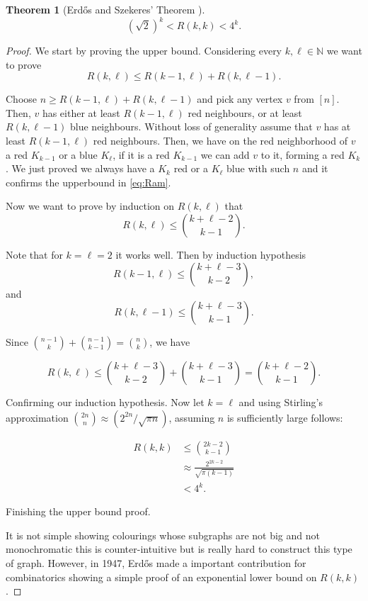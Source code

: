 \documentclass[12pt,twoside,a4paper,bibliography=totocnumbered]{book}
\numberwithin{equation}{section}
\newtheorem{theorem}             {Theorem}[section]
\theoremstyle{remark}
\begin{document}
\begin{theorem}[{Erd\H{o}s and Szekeres' Theorem \cite{ersz35, Er47}}]\label{thm:ErdosandS}
$$(\sqrt{2})^k < R(k,k) < 4^k.$$
\end{theorem}
\begin{proof} We start by proving the upper bound. Considering every $k, \ell \in \mathbb{N}$ we want to prove
\begin{equation}\label{eq:Ram}
R(k,\ell ) \leq R(k-1,\ell )+R(k,\ell-1).
\end{equation}

Choose $n \geq R(k-1,\ell) + R(k, \ell-1)$ and pick any vertex $v$ from $[n]$. Then, $v$ has either at least $R(k-1,\ell)$ red neighbours, or at least $R(k,\ell-1)$ blue neighbours. Without loss of generality assume that $v$ has at least $R(k-1,\ell)$ red neighbours. Then, we have on the red neighborhood of $v$ a red $K_{k-1}$ or a blue $K_{\ell}$, if it is a red $K_{k-1}$ we can add $v$ to it, forming a red $K_k$. We just proved we always have a $K_k$ red or a $K_{\ell}$ blue with such $n$ and it confirms the upperbound in \ref{eq:Ram}.

Now we want to prove by induction on $R(k,\ell)$ that
$$R(k,\ell) \leq \binom{k+\ell - 2}{k - 1}.$$

Note that for $k = \ell = 2$ it works well. Then by induction hypothesis
$$R(k-1,\ell)\leq \binom{k+\ell -3}{k-2},$$ and $$R(k,\ell-1)\leq \binom{k+\ell-3}{k-1}.$$

Since $\binom{n-1}{k} + \binom{n-1}{k-1} = \binom{n}{k}$, we have

$$R(k,\ell)\leq \binom{k+\ell-3}{k-2} + \binom{k+\ell-3}{k-1} = \binom{k+ \ell -2}{k-1}.$$

Confirming our induction hypothesis. Now let $k = \ell$ and using Stirling's approximation  $\binom{2n}{n} \approx (2^{2n}/\sqrt{\pi n})$, assuming $n$ is sufficiently large follows:

\begin{align*}
R(k,k) &\leq \binom{2k -2}{k-1}\\
& \approx \frac{2^{2k-2}}{\sqrt{\pi (k-1)}}\\
& < 4^k.
\end{align*}

Finishing the upper bound proof.

It is not simple showing colourings whose subgraphs are not big and not monochromatic this is counter-intuitive but is really hard to construct this type of graph. However, in 1947, Erd\H{o}s made a important contribution for combinatorics showing a simple proof of an exponential lower bound on $R(k,k)$.


\end{proof}
\end{document}
